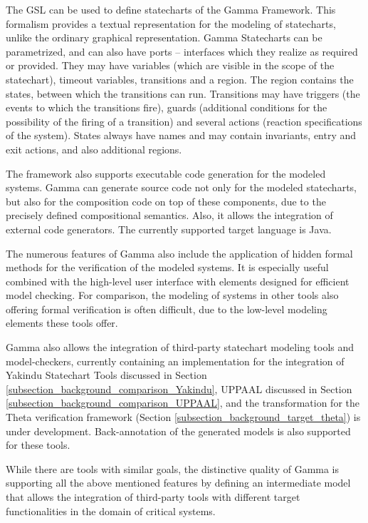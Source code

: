 The GSL can be used to define statecharts of the Gamma Framework. This formalism provides a textual representation for the modeling of statecharts, unlike the ordinary graphical representation. Gamma Statecharts can be parametrized, and can also have ports -- interfaces which they realize as required or provided. They may have variables (which are visible in the scope of the statechart), timeout variables, transitions and a region. The region contains the states, between which the transitions can run. Transitions may have triggers (the events to which the transitions fire), guards (additional conditions for the possibility of the firing of a transition) and several actions (reaction specifications of the system). States always have names and may contain invariants, entry and exit actions, and also additional regions.

The framework also supports executable code generation for the modeled systems. Gamma can generate source code not only for the modeled statecharts, but also for the composition code on top of these components, due to the precisely defined compositional semantics. Also, it allows the integration of external code generators. The currently supported target language is Java.

The numerous features of Gamma also include the application of hidden formal methods for the verification of the modeled systems. It is especially useful combined with the high-level user interface with elements designed for efficient model checking. For comparison, the modeling of systems in other tools also offering formal verification is often difficult, due to the low-level modeling elements these tools offer.

Gamma also allows the integration of third-party statechart modeling tools and model-checkers, currently containing an implementation for the integration of Yakindu Statechart Tools discussed in Section \ref{subsection_background_comparison_Yakindu}, UPPAAL discussed in Section \ref{subsection_background_comparison_UPPAAL}, and the transformation for the Theta verification framework (Section \ref{subsection_background_target_theta}) is under development. Back-annotation of the generated models is also supported for these tools.

While there are tools with similar goals, the distinctive quality of Gamma is supporting all the above mentioned features by defining an intermediate model that allows the integration of third-party tools with different target functionalities in the domain of critical systems.

